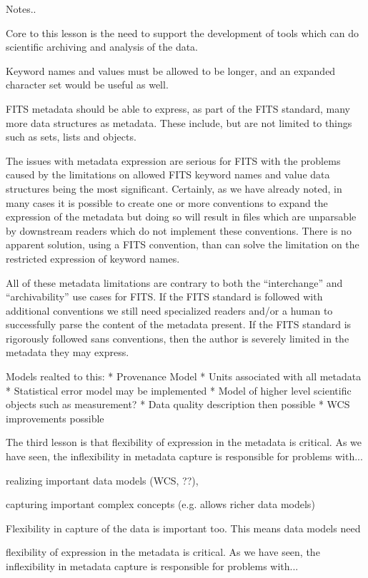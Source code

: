 \documentclass[final,authoryear,5p,times,twocolumn]{elsarticle}
\begin{document}
{{{\color{red} Notes..

Core to this lesson is the need to support the development of tools
which can do scientific archiving and analysis of the data.

Keyword names and values must be allowed to be longer, and an expanded character set would be useful as well. 

FITS metadata should be able to
express, as part of the FITS standard, many more data structures as
metadata. These include, but are not limited to things such as sets,
lists and objects.


The issues with metadata expression are serious for FITS with the
problems caused by the limitations on allowed FITS keyword names and
value data structures being the most significant. Certainly, as we
have already noted, in many cases it is possible to create one or more
conventions to expand the expression of the metadata but doing so will
result in files which are unparsable by downstream readers which
do not implement these conventions. There is no apparent solution,
using a FITS convention, than can solve the limitation on the
restricted expression of keyword names.


All of these metadata limitations are contrary to both the
``interchange'' and ``archivability'' use cases for FITS. If the FITS
standard is followed with additional conventions we still need
specialized readers and/or a human to successfully parse the content
of the metadata present. If the FITS standard is rigorously followed
sans conventions, then the author is severely limited in the metadata
they may express.


Models realted to this:
* Provenance Model
* Units associated with all metadata 
* Statistical error model may be implemented 
* Model of higher level scientific objects such as measurement?
* Data quality description then possible
* WCS improvements possible

The third lesson is that flexibility of expression in the metadata
is critical. As we have seen, the inflexibility in metadata capture
is responsible for problems with...

realizing important data models (WCS, ??),

capturing important complex concepts (e.g. allows richer data models)

Flexibility in capture of the data is important too. This means
data models need


 flexibility of expression in the metadata
is critical. As we have seen, the inflexibility in metadata capture
is responsible for problems with...

}}}
\end{document}
